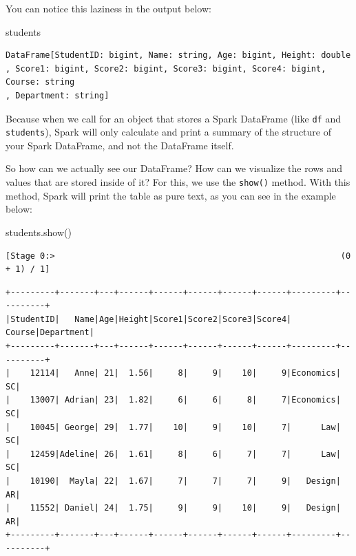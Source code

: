 \documentclass[
  11pt,
  letterpaper,
  DIV=11,
  numbers=noendperiod]{scrreprt}
\newenvironment{Shaded}{\begin{snugshade}}{\end{snugshade}}
\newcommand{\NormalTok}[1]{\textcolor[rgb]{0.00,0.23,0.31}{#1}}
\begin{document}
You can notice this laziness in the output below:

\begin{Shaded}
\begin{Highlighting}[]
\NormalTok{students}
\end{Highlighting}
\end{Shaded}

\begin{verbatim}
DataFrame[StudentID: bigint, Name: string, Age: bigint, Height: double
, Score1: bigint, Score2: bigint, Score3: bigint, Score4: bigint, Course: string
, Department: string]
\end{verbatim}

Because when we call for an object that stores a Spark DataFrame (like
\texttt{df} and \texttt{students}), Spark will only calculate and print
a summary of the structure of your Spark DataFrame, and not the
DataFrame itself.

So how can we actually see our DataFrame? How can we visualize the rows
and values that are stored inside of it? For this, we use the
\texttt{show()} method. With this method, Spark will print the table as
pure text, as you can see in the example below:

\begin{Shaded}
\begin{Highlighting}[]
\NormalTok{students.show()}
\end{Highlighting}
\end{Shaded}

\begin{verbatim}
[Stage 0:>                                                          (0 + 1) / 1]                                                                                
\end{verbatim}

\begin{verbatim}
+---------+-------+---+------+------+------+------+------+---------+----------+
|StudentID|   Name|Age|Height|Score1|Score2|Score3|Score4|   Course|Department|
+---------+-------+---+------+------+------+------+------+---------+----------+
|    12114|   Anne| 21|  1.56|     8|     9|    10|     9|Economics|        SC|
|    13007| Adrian| 23|  1.82|     6|     6|     8|     7|Economics|        SC|
|    10045| George| 29|  1.77|    10|     9|    10|     7|      Law|        SC|
|    12459|Adeline| 26|  1.61|     8|     6|     7|     7|      Law|        SC|
|    10190|  Mayla| 22|  1.67|     7|     7|     7|     9|   Design|        AR|
|    11552| Daniel| 24|  1.75|     9|     9|    10|     9|   Design|        AR|
+---------+-------+---+------+------+------+------+------+---------+----------+
\end{verbatim}
\end{document}
